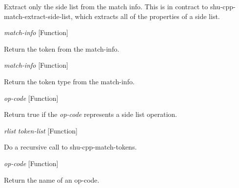 \begin{doc-string}
Extract only the side list from the match info.  This is in contract to
shu-cpp-match-extract-side-list, which extracts all of the properties of a
side list.
\end{doc-string}

\vspace{1em}
\noindent
{}
\usebox{\funcname}\emph{match-info}
 \hfill [Function]

\begin{doc-string}
Return the token from the match-info.
\end{doc-string}

\vspace{1em}
\noindent
{}
\usebox{\funcname}\emph{match-info}
 \hfill [Function]

\begin{doc-string}
Return the token type from the match-info.
\end{doc-string}

\vspace{1em}
\noindent
{}
\usebox{\funcname}\emph{op-code}
 \hfill [Function]

\begin{doc-string}
Return true if the \emph{op-code} represents a side list operation.
\end{doc-string}

\vspace{1em}
\noindent
{}
\usebox{\funcname}\emph{rlist} \emph{token-list}
 \hfill [Function]
\hspace*{\wd\funcname}

\begin{doc-string}
Do a recursive call to shu-cpp-match-tokens.
\end{doc-string}

\vspace{1em}
\noindent
{}
\usebox{\funcname}\emph{op-code}
 \hfill [Function]

\begin{doc-string}
Return the name of an op-code.
\end{doc-string}

